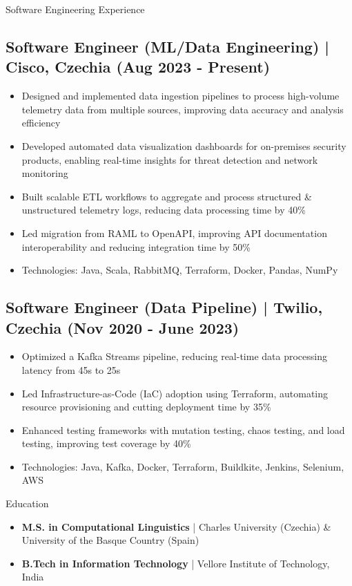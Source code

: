 \documentclass{resume} %
\begin{document}
\begin{rSection}{Software Engineering Experience}

    \subsection*{Software Engineer (ML/Data Engineering) | Cisco, Czechia (Aug 2023 - Present)}
        \begin{itemize}
            \item Designed and implemented data ingestion pipelines to process high-volume telemetry data from multiple sources, improving data accuracy and analysis efficiency
            \item Developed automated data visualization dashboards for on-premises security products, enabling real-time insights for threat detection and network monitoring
            \item Built scalable ETL workflows to aggregate and process structured \& unstructured telemetry logs, reducing data processing time by 40\%%
            \item Led migration from RAML to OpenAPI, improving API documentation interoperability and reducing integration time by 50\%
            \item Technologies: Java, Scala, RabbitMQ, Terraform, Docker, Pandas, NumPy
        \end{itemize} 
    \subsection*{Software Engineer (Data Pipeline) | Twilio, Czechia (Nov 2020 - June 2023)}
        \begin{itemize}
            \item Optimized a Kafka Streams pipeline, reducing real-time data processing latency from 45s to 25s
            \item Led Infrastructure-as-Code (IaC) adoption using Terraform, automating resource provisioning and cutting deployment time by 35\%%
            \item Enhanced testing frameworks with mutation testing, chaos testing, and load testing, improving test coverage by 40\%
            \item Technologies: Java, Kafka, Docker, Terraform, Buildkite, Jenkins, Selenium, AWS
        \end{itemize}
\end{rSection}

\begin{rSection}{Education}
    \begin{itemize}
        \item \textbf{M.S. in Computational Linguistics} | Charles University (Czechia) \& University of the Basque Country (Spain)
        \item \textbf{B.Tech in Information Technology} | Vellore Institute of Technology, India
    \end{itemize}
\end{rSection}
\end{document}
